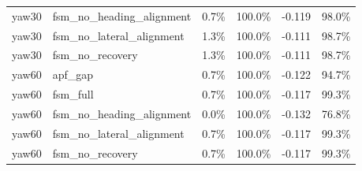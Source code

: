 \begin{tabular}{llrrrr}
yaw30 & fsm\_no\_heading\_alignment & 0.7\% & 100.0\% & -0.119 & 98.0\% \\
yaw30 & fsm\_no\_lateral\_alignment & 1.3\% & 100.0\% & -0.111 & 98.7\% \\
yaw30 & fsm\_no\_recovery & 1.3\% & 100.0\% & -0.111 & 98.7\% \\
yaw60 & apf\_gap & 0.7\% & 100.0\% & -0.122 & 94.7\% \\
yaw60 & fsm\_full & 0.7\% & 100.0\% & -0.117 & 99.3\% \\
yaw60 & fsm\_no\_heading\_alignment & 0.0\% & 100.0\% & -0.132 & 76.8\% \\
yaw60 & fsm\_no\_lateral\_alignment & 0.7\% & 100.0\% & -0.117 & 99.3\% \\
yaw60 & fsm\_no\_recovery & 0.7\% & 100.0\% & -0.117 & 99.3\% \\
\bottomrule
\end{tabular}
